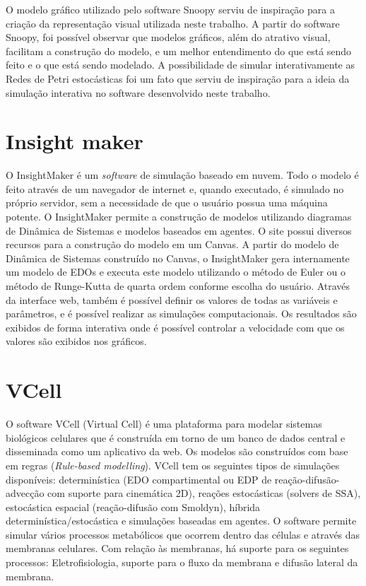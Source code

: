 \documentclass[
	12pt,				%
	openright,			%
	oneside,			%
	a4paper,			%
	main=brazil,
	english,			%
	]{ufsj-abntex2}
\begin{document}
O modelo gráfico utilizado pelo software Snoopy serviu de inspiração para a criação da representação visual utilizada neste trabalho. A partir do software Snoopy, foi possível observar que modelos gráficos, além do atrativo visual, facilitam a construção do modelo, e um melhor entendimento do que está sendo feito e o que está sendo modelado. A possibilidade de simular interativamente as Redes de Petri estocásticas foi um fato que serviu de inspiração para a ideia da simulação interativa no software desenvolvido neste trabalho. 

\section{Insight maker}
    
O InsightMaker \cite{insightmaker} é um \textit{software} de simulação baseado em nuvem. Todo o modelo é feito através de um navegador de internet e, quando executado, é simulado no próprio servidor, sem a necessidade de que o usuário possua uma máquina potente. O InsightMaker \cite{insightmaker} permite a construção de modelos utilizando diagramas de Dinâmica de Sistemas e modelos baseados em agentes. O site possui diversos recursos para a construção do modelo em um Canvas. A partir do modelo de Dinâmica de Sistemas construído no Canvas, o InsightMaker \cite{insightmaker} gera internamente um modelo de EDOs e executa este modelo utilizando o método de Euler ou o método de Runge-Kutta de quarta ordem conforme escolha do usuário. Através da interface web, também é possível definir os valores de todas as variáveis e parâmetros, e é possível realizar as simulações computacionais. Os resultados são exibidos de forma interativa onde é possível controlar a velocidade com que os valores são exibidos nos gráficos. 

\section{VCell}

O software VCell (Virtual Cell) \cite{vcell,VCellref1} é uma plataforma para modelar sistemas biológicos celulares que é construída em torno de um banco de dados central e disseminada como um aplicativo da web. Os modelos são construídos com base em regras (\textit{Rule-based modelling}). VCell tem os seguintes tipos de simulações disponíveis: determinística (EDO compartimental ou EDP de reação-difusão-advecção com suporte para cinemática 2D), reações estocásticas (solvers de SSA), estocástica espacial (reação-difusão com Smoldyn), híbrida determinística/estocástica e simulações baseadas em agentes. O software permite simular vários processos metabólicos que ocorrem dentro das células e através das membranas celulares. Com relação às membranas, há suporte para os seguintes processos: Eletrofisiologia, suporte para o fluxo da membrana e difusão lateral da membrana. 
\end{document}
